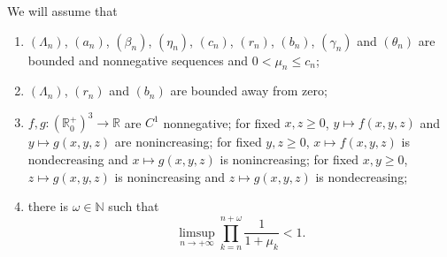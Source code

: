 \documentclass[reqno]{amsart}
\renewcommand{\le}{\leqslant}
\renewcommand{\ge}{\geqslant}
\newcommand{\N}{\ensuremath{\mathds N}}
\newcommand{\R}{\ensuremath{\mathds R}}
\begin{document}
We will assume that
\begin{enumerate}[H$1$)]
\item \label{Cond-1} $(\Lambda_n)$, $(a_n)$, $(\beta_n)$, $(\eta_n)$, $(c_n)$, $(r_n)$, $(b_n)$, $(\gamma_n)$ and $(\theta_n)$ are bounded and nonnegative sequences and  $0<\mu_n \le c_n$;
\item \label{Cond-1a}$(\Lambda_n)$, $(r_n)$ and $(b_n)$ are bounded away from zero;
\item \label{cond-f} $f,g:(\R_0^+)^3\to \R$ are $C^1$ nonnegative; for fixed $x,z \ge 0$, $y\mapsto f(x,y,z)$ and $y \mapsto g(x,y,z)$ are nonincreasing; for fixed $y,z \ge 0$, $x \mapsto f(x,y,z)$ is nondecreasing and $x \mapsto g(x,y,z)$ is nonincreasing; for fixed $x,y \ge 0$, $z \mapsto g(x,y,z)$ is nonincreasing and $z \mapsto g(x,y,z)$ is nondecreasing;
\item \label{Cond-2} there is $\omega \in \N$ such that
    $$\limsup_{n \to +\infty} \prod_{k=n}^{n+\omega} \dfrac{1}{1+\mu_k} < 1.$$
\end{enumerate}
\end{document}
